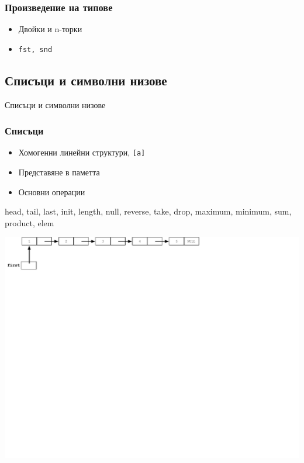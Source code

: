 \documentclass{beamer}
\begin{document}
\begin{frame}[fragile]
  \frametitle{Произведение на типове}

  \begin{itemize}
    \item Двойки и n-торки
    \item \verb#fst, snd#
  \end{itemize}

\end{frame}


\subsection{Списъци и символни низове}

\begin{frame}
  \centerline{Списъци и символни низове}
\end{frame}
  
\begin{frame}[fragile]
  \frametitle{Списъци}

  \begin{itemize}
    \item Хомогенни линейни структури, \verb|[a]|
    \item Представяне в паметта
    \item Основни операции
  \end{itemize}

  \bigskip

  head, tail, last, init, length, null, reverse, take, drop, maximum, minimum, sum, product, elem

  \bigskip

  \includegraphics[width=14.0cm]{images/02_ll_flatchain}

\end{frame}
\end{document}
